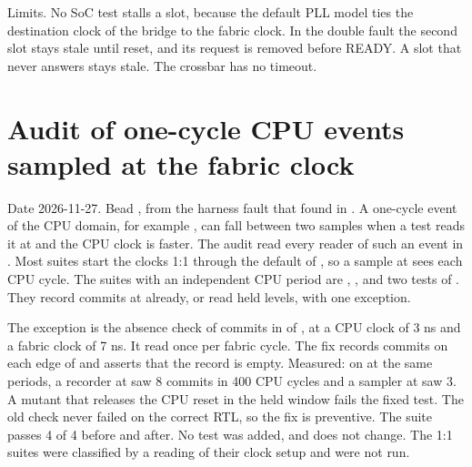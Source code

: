 \begin{record}

Limits. No SoC test stalls a slot, because the default PLL model ties the destination clock of the bridge to the fabric clock. In the double fault the second slot stays stale until reset, and its request is removed before READY. A slot that never answers stays stale. The crossbar has no timeout.

\end{record}

\section{Audit of one-cycle CPU events sampled at the fabric clock}\label{cr:defect:cpu-event-sampling-audit}

\begin{record}

Date 2026-11-27. Bead , from the harness fault that  found in . A one-cycle event of the CPU domain, for example , can fall between two samples when a test reads it at  and the CPU clock is faster. The audit read every reader of such an event in . Most suites start the clocks 1:1 through the default of , so a sample at  sees each CPU cycle. The suites with an independent CPU period are , ,  and two tests of . They record commits at  already, or read held levels, with one exception.

\end{record}

\begin{record}

The exception is the absence check of commits in  of , at a CPU clock of 3 ns and a fabric clock of 7 ns. It read  once per fabric cycle. The fix records commits on each edge of  and asserts that the record is empty. Measured: on  at the same periods, a recorder at  saw 8 commits in 400 CPU cycles and a sampler at  saw 3. A mutant that releases the CPU reset in the held window fails the fixed test. The old check never failed on the correct RTL, so the fix is preventive. The suite passes 4 of 4 before and after. No test was added, and  does not change. The 1:1 suites were classified by a reading of their clock setup and were not run.

\end{record}

